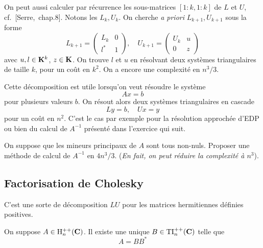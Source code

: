 On peut aussi calculer par récurrence les sous-matrices $[1:k,1:k]$ de $L$ et
$U$, cf.~[Serre,~chap.8]. Notons les $L_k,U_k$.
On cherche \emph{a priori} $L_{k+1},U_{k+1}$ sous la forme
\[
L_{k+1} = \left(\begin{array}{cc}
L_k & 0 \\
l^* & 1
\end{array}\right), \quad U_{k+1} = \left(\begin{array}{cc}
U_k & u \\
0 & z
\end{array}\right)
\]
avec $u,l \in \mathbf{K}^k$, $z \in \mathbf{K}$. On trouve $l$ et $u$ en résolvant deux
systèmes triangulaires de taille $k$, pour un coût en $k^2$. On a encore une
complexité en $n^3/3$.

\begin{remark}
Cette décomposition est utile lorsqu'on veut résoudre le système
\[
Ax = b
\]
pour plusieurs valeurs $b$. On résout alors deux systèmes triangulaires en cascade
\[
Ly = b, \quad Ux = y
\]
pour un coût en $n^2$. C'est le cas par exemple pour la résolution approchée
d'EDP %
ou bien du calcul de $A^{-1}$ présenté dans l'exercice qui suit.
\end{remark}

\begin{exercice}
On suppose que les mineurs principaux de $A$ sont tous non-nuls. Proposer une
méthode de calcul de $A^{-1}$ en $\displaystyle {4n^3}/{3}$. (\emph{En fait,
on peut réduire la complexité à $n^3$}).
\end{exercice}


\subsection{Factorisation de Cholesky}

C'est une sorte de décomposition $LU$ pour les matrices hermitiennes définies
positives.

\begin{theorem}
\label{th:cholesky}
On suppose $A \in \mathrm{H}^{++}_n(\mathbf{C})$. Il existe une unique $B \in \mathrm{TI}^{++}_n(\mathbf{C})$
telle que
\[
A = B B^*
\]
\end{theorem}

